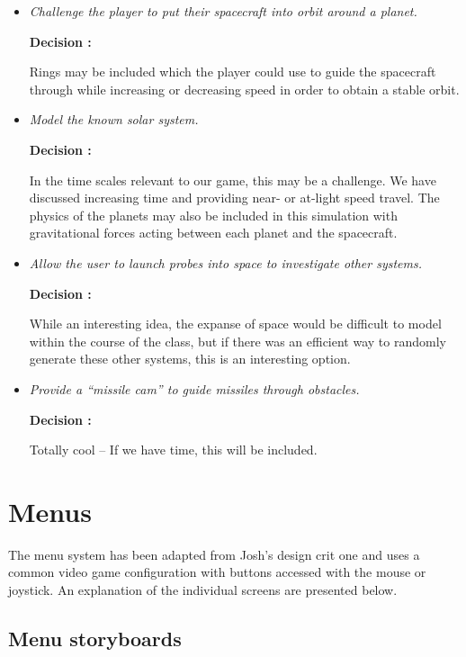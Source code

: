 \begin{itemize}
  \item \emph{Challenge the player to put their spacecraft into orbit around a planet.}
        
        \textbf{Decision : } \parbox[t]{5in}{Rings may be included which the player could use to guide the spacecraft through while increasing or decreasing speed in order to obtain a stable orbit.}

  \item \emph{Model the known solar system.}
        
        \textbf{Decision : } \parbox[t]{5in}{In the time scales relevant to our game, this may be a challenge.  We have discussed increasing time and providing near- or at-light speed travel.  The physics of the planets may also be included in this simulation with gravitational forces acting between each planet and the spacecraft.}

  \item \emph{Allow the user to launch probes into space to investigate other systems.}
        
        \textbf{Decision : } \parbox[t]{5in}{While an interesting idea, the expanse of space would be difficult to model within the course of the class, but if there was an efficient way to randomly generate these other systems, this is an interesting option.}

  \item \emph{Provide a ``missile cam'' to guide missiles through obstacles.}
        
        \textbf{Decision : } \parbox[t]{5in}{Totally cool -- If we have time, this will be included.}
\end{itemize}

\section*{Menus}

The menu system has been adapted from Josh's design crit one and uses a common video game configuration with buttons accessed with the mouse or joystick.  An explanation of the individual screens are presented below.

\subsection*{Menu storyboards}

